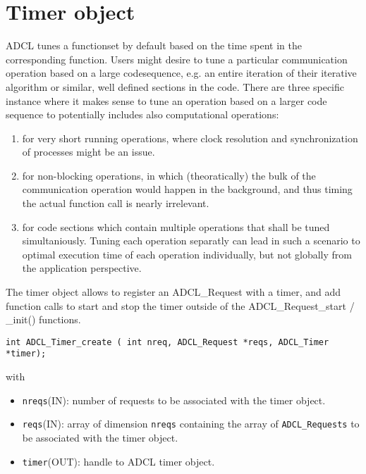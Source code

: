 \section{Timer object}
\label{sec:timer}

ADCL tunes a functionset by default based on the time spent in the
corresponding function. Users might desire to tune a particular communication
operation based on a large codesequence, e.g. an entire iteration of their
iterative algorithm or similar, well defined sections in the code. There are
three specific instance where it makes sense to tune an operation based on a
larger code sequence to potentially includes also computational operations:

\begin{enumerate}

\item for very short running operations, where clock resolution and
  synchronization of processes might be an issue.

\item for non-blocking operations, in which (theoratically) the bulk of the
  communication operation would happen in the background, and thus timing the
  actual function call is nearly irrelevant.

\item for code sections which contain multiple operations that shall be tuned
  simultaniously. Tuning each operation separatly can lead in such a scenario
  to optimal execution time of each operation individually, but not globally
  from the application perspective.

\end{enumerate}

The timer object allows to register an ADCL\_Request with a timer, and add
function calls to start and stop the timer outside of the
ADCL\_Request\_start / \_init() functions.

\begin{verbatim}
int ADCL_Timer_create ( int nreq, ADCL_Request *reqs, ADCL_Timer *timer);
\end{verbatim}
with
\begin{itemize}
\item {\tt nreqs}(IN): number of requests to be associated with the timer object.
\item {\tt reqs}(IN): array of dimension {\tt nreqs} containing the array of
  {\tt ADCL\_Requests} to be associated with the timer object.
\item {\tt timer}(OUT): handle to ADCL timer object.
\end{itemize}


